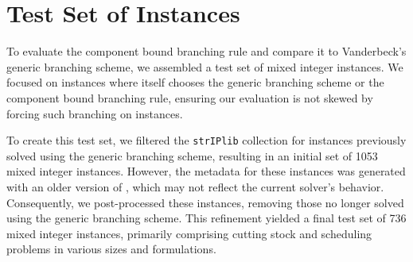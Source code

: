 \section{Test Set of Instances}\label{sec:evaluation_testset}
To evaluate the component bound branching rule and compare it to Vanderbeck's generic branching scheme, we assembled a test set of mixed integer instances. We focused on instances where \GCG{} itself chooses the generic branching scheme or the component bound branching rule, ensuring our evaluation is not skewed by forcing such branching on instances.

To create this test set, we filtered the \texttt{strIPlib} collection \cite{strIPlib} for instances previously solved using the generic branching scheme, resulting in an initial set of 1053 mixed integer instances. However, the metadata for these instances was generated with an older version of \GCG{}, which may not reflect the current solver's behavior. Consequently, we post-processed these instances, removing those no longer solved using the generic branching scheme. This refinement yielded a final test set of 736 mixed integer instances, primarily comprising cutting stock and scheduling problems in various sizes and formulations.
